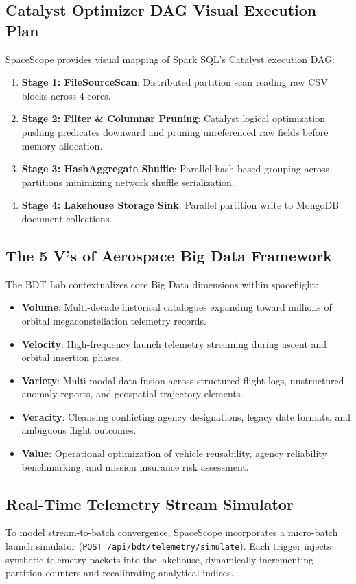 \documentclass[10pt]{article}
\begin{document}
\subsection{Catalyst Optimizer DAG Visual Execution Plan}
SpaceScope provides visual mapping of Spark SQL's Catalyst execution DAG:
\begin{enumerate}
    \item \textbf{Stage 1: FileSourceScan}: Distributed partition scan reading raw CSV blocks across 4 cores.
    \item \textbf{Stage 2: Filter \& Columnar Pruning}: Catalyst logical optimization pushing predicates downward and pruning unreferenced raw fields before memory allocation.
    \item \textbf{Stage 3: HashAggregate Shuffle}: Parallel hash-based grouping across partitions minimizing network shuffle serialization.
    \item \textbf{Stage 4: Lakehouse Storage Sink}: Parallel partition write to MongoDB document collections.
\end{enumerate}

\subsection{The 5 V's of Aerospace Big Data Framework}
The BDT Lab contextualizes core Big Data dimensions within spaceflight:
\begin{itemize}
    \item \textbf{Volume}: Multi-decade historical catalogues expanding toward millions of orbital megaconstellation telemetry records.
    \item \textbf{Velocity}: High-frequency launch telemetry streaming during ascent and orbital insertion phases.
    \item \textbf{Variety}: Multi-modal data fusion across structured flight logs, unstructured anomaly reports, and geospatial trajectory elements.
    \item \textbf{Veracity}: Cleansing conflicting agency designations, legacy date formats, and ambiguous flight outcomes.
    \item \textbf{Value}: Operational optimization of vehicle reusability, agency reliability benchmarking, and mission insurance risk assessment.
\end{itemize}

\subsection{Real-Time Telemetry Stream Simulator}
To model stream-to-batch convergence, SpaceScope incorporates a micro-batch launch simulator (\texttt{POST /api/bdt/telemetry/simulate}). Each trigger injects synthetic telemetry packets into the lakehouse, dynamically incrementing partition counters and recalibrating analytical indices.
\end{document}

